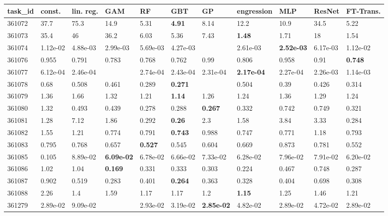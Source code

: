 \begin{table}[ht!]
\centering
\begingroup\footnotesize
\begin{tabular}{lllllllllll}
  \hline
\hline
task\_id & const. & lin. reg. & GAM & RF & GBT & GP & engression & MLP & ResNet & FT-Trans. \\ 
  \hline
361072 & 37.7 & 75.3 & 14.9 & 5.31 & \textbf{4.91} & 8.14 & 12.2 & 10.9 & 34.5 & 5.22 \\ 
  361073 & 35.4 & 46 & 36.2 & 6.03 & 5.36 & 7.43 & \textbf{1.48} & 1.71 & 18 & 1.54 \\ 
  361074 & 1.12e-02 & 4.88e-03 & 2.99e-03 & 5.69e-03 & 4.27e-03 &  & 2.61e-03 & \textbf{2.52e-03} & 6.17e-03 & 1.12e-02 \\ 
  361076 & 0.955 & 0.791 & 0.783 & 0.768 & 0.762 & 0.99 & 0.806 & 0.958 & 0.91 & \textbf{0.748} \\ 
  361077 & 6.12e-04 & 2.46e-04 &  & 2.74e-04 & 2.43e-04 & 2.31e-04 & \textbf{2.17e-04} & 2.27e-04 & 2.26e-03 & 1.14e-03 \\ 
  361078 & 0.68 & 0.508 & 0.461 & 0.289 & \textbf{0.271} &  & 0.504 & 0.39 & 0.426 & 0.314 \\ 
  361079 & 1.36 & 1.66 & 1.32 & 1.21 & \textbf{1.14} & 1.26 & 1.24 & 1.36 & 1.29 & 1.24 \\ 
  361080 & 1.32 & 0.493 & 0.439 & 0.278 & 0.288 & \textbf{0.267} & 0.332 & 0.742 & 0.749 & 0.321 \\ 
  361081 & 1.28 & 7.12 & 1.86 & 0.292 & \textbf{0.26} & 2.3 & 1.58 & 3.84 & 3.33 & 0.284 \\ 
  361082 & 1.55 & 1.21 & 0.774 & 0.791 & \textbf{0.743} & 0.988 & 0.747 & 0.771 & 1.18 & 0.793 \\ 
  361083 & 0.795 & 0.768 & 0.657 & \textbf{0.527} & 0.545 & 0.604 & 0.669 & 0.873 & 0.781 & 0.552 \\ 
  361085 & 0.105 & 8.89e-02 & \textbf{6.09e-02} & 6.78e-02 & 6.66e-02 & 7.33e-02 & 6.28e-02 & 7.96e-02 & 7.91e-02 & 6.20e-02 \\ 
  361086 & 1.02 & 1.04 & \textbf{0.169} & 0.331 & 0.333 & 0.303 & 0.224 & 0.467 & 0.748 & 0.287 \\ 
  361087 & 0.902 & 0.519 & 0.283 & 0.401 & \textbf{0.264} & 0.363 & 0.328 & 0.404 & 0.698 & 0.308 \\ 
  361088 & 2.26 & 1.4 & 1.59 & 1.17 & 1.17 & 1.2 & \textbf{1.15} & 1.25 & 1.46 & 1.21 \\ 
  361279 & 2.89e-02 & 9.09e-02 &  & 2.93e-02 & 3.19e-02 & \textbf{2.85e-02} & 4.82e-02 & 2.89e-02 & 4.72e-02 & 2.89e-02 \\ 

\end{tabular}
\end{table}
